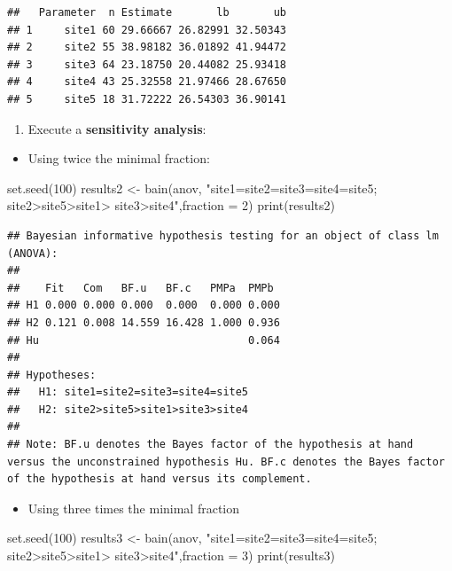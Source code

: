 \documentclass[
]{book}
\newenvironment{Shaded}{\begin{snugshade}}{\end{snugshade}}
\newcommand{\AttributeTok}[1]{\textcolor[rgb]{0.77,0.63,0.00}{#1}}
\newcommand{\DecValTok}[1]{\textcolor[rgb]{0.00,0.00,0.81}{#1}}
\newcommand{\FunctionTok}[1]{\textcolor[rgb]{0.00,0.00,0.00}{#1}}
\newcommand{\NormalTok}[1]{#1}
\newcommand{\OtherTok}[1]{\textcolor[rgb]{0.56,0.35,0.01}{#1}}
\newcommand{\StringTok}[1]{\textcolor[rgb]{0.31,0.60,0.02}{#1}}
\providecommand{\tightlist}{%
  \setlength{\itemsep}{0pt}\setlength{\parskip}{0pt}}
\begin{document}
\begin{verbatim}
##   Parameter  n Estimate       lb       ub
## 1     site1 60 29.66667 26.82991 32.50343
## 2     site2 55 38.98182 36.01892 41.94472
## 3     site3 64 23.18750 20.44082 25.93418
## 4     site4 43 25.32558 21.97466 28.67650
## 5     site5 18 31.72222 26.54303 36.90141
\end{verbatim}

\begin{enumerate}
\def\labelenumi{\arabic{enumi})}
\setcounter{enumi}{5}
\tightlist
\item
  Execute a \textbf{sensitivity analysis}:
\end{enumerate}

\begin{itemize}
\tightlist
\item
  Using twice the minimal fraction:
\end{itemize}

\begin{Shaded}
\begin{Highlighting}[]
\FunctionTok{set.seed}\NormalTok{(}\DecValTok{100}\NormalTok{)}
\NormalTok{results2 }\OtherTok{\textless{}{-}} \FunctionTok{bain}\NormalTok{(anov, }\StringTok{"site1=site2=site3=site4=site5; site2\textgreater{}site5\textgreater{}site1\textgreater{}}
\StringTok{site3\textgreater{}site4"}\NormalTok{,}\AttributeTok{fraction =} \DecValTok{2}\NormalTok{)}
\FunctionTok{print}\NormalTok{(results2)}
\end{Highlighting}
\end{Shaded}

\begin{verbatim}
## Bayesian informative hypothesis testing for an object of class lm (ANOVA):
## 
##    Fit   Com   BF.u   BF.c   PMPa  PMPb 
## H1 0.000 0.000 0.000  0.000  0.000 0.000
## H2 0.121 0.008 14.559 16.428 1.000 0.936
## Hu                                 0.064
## 
## Hypotheses:
##   H1: site1=site2=site3=site4=site5
##   H2: site2>site5>site1>site3>site4
## 
## Note: BF.u denotes the Bayes factor of the hypothesis at hand versus the unconstrained hypothesis Hu. BF.c denotes the Bayes factor of the hypothesis at hand versus its complement.
\end{verbatim}

\begin{itemize}
\tightlist
\item
  Using three times the minimal fraction
\end{itemize}

\begin{Shaded}
\begin{Highlighting}[]
\FunctionTok{set.seed}\NormalTok{(}\DecValTok{100}\NormalTok{)}
\NormalTok{results3 }\OtherTok{\textless{}{-}} \FunctionTok{bain}\NormalTok{(anov, }\StringTok{"site1=site2=site3=site4=site5; site2\textgreater{}site5\textgreater{}site1\textgreater{}}
\StringTok{site3\textgreater{}site4"}\NormalTok{,}\AttributeTok{fraction =} \DecValTok{3}\NormalTok{)}
\FunctionTok{print}\NormalTok{(results3)}
\end{Highlighting}
\end{Shaded}
\end{document}
